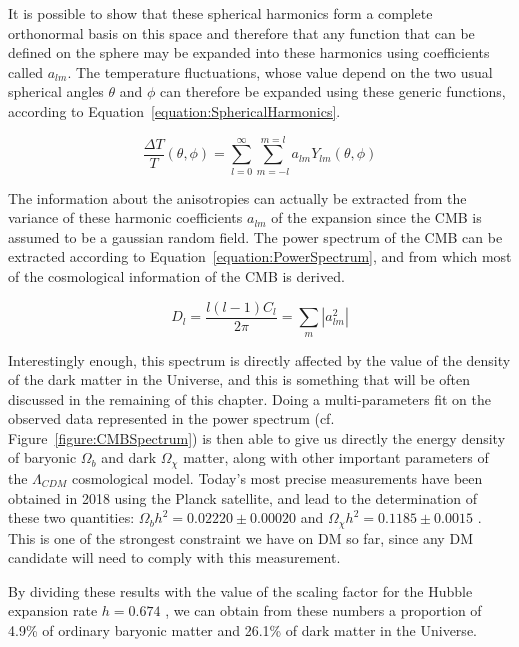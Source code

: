\documentclass[a4paper, 10pt, openright]{report}
\begin{document}
It is possible to show that these spherical harmonics form a complete orthonormal basis on this space and therefore that any function that can be defined on the sphere may be expanded into these harmonics using coefficients called $a_{lm}$. The temperature fluctuations, whose value depend on the two usual spherical angles $\theta$ and $\phi$ can therefore be expanded using these generic functions, according to Equation~\ref{equation:SphericalHarmonics}.

\begin{equation} \label{equation:SphericalHarmonics}
\frac{\Delta T}{T}(\theta, \phi) = \sum_{l=0}^{\infty} \sum_{m=-l}^{m=l} a_{lm} Y_{lm} (\theta, \phi)
\end{equation}

The information about the anisotropies can actually be extracted from the variance of these harmonic coefficients $a_{lm}$ of the expansion since the \ac{CMB} is assumed to be a gaussian random field. The power spectrum of the \ac{CMB} can be extracted according to Equation~\ref{equation:PowerSpectrum}, and from which most of the cosmological information of the \ac{CMB} is derived.

\begin{equation} \label{equation:PowerSpectrum}
D_l = \frac{l(l-1) C_l} {2\pi} = \sum_m |a_{lm}^2|
\end{equation}

Interestingly enough, this spectrum is directly affected by the value of the density of the dark matter in the Universe, and this is something that will be often discussed in the remaining of this chapter. Doing a multi-parameters fit on the observed data represented in the power spectrum (cf. Figure~\ref{figure:CMBSpectrum}) is then able to give us directly the energy density of baryonic $\Omega_b$ and dark $\Omega_\chi$ matter, along with other important parameters of the $\Lambda_{CDM}$ cosmological model. Today's most precise measurements have been obtained in 2018 using the Planck satellite, and lead to the determination of these two quantities: $\Omega_b h^2 = 0.02220 \pm 0.00020$ and $\Omega_\chi h^2 = 0.1185 \pm 0.0015$ \cite{Planck}. This is one of the strongest constraint we have on \ac{DM} so far, since any \ac{DM} candidate will need to comply with this measurement.

By dividing these results with the value of the scaling factor for the Hubble expansion rate $h = 0.674$ \cite{Constants}, we can obtain from these numbers a proportion of 4.9\% of ordinary baryonic matter and 26.1\% of dark matter in the Universe.
\end{document}
